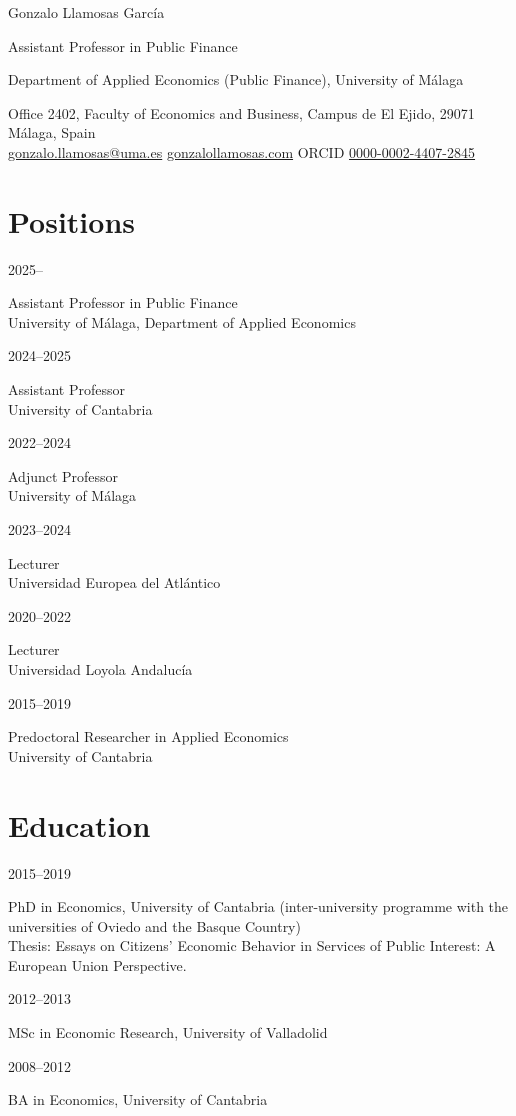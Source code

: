 \documentclass[11pt,a4paper]{article}
\newcommand{\entry}[2]{\begin{minipage}[t]{2.6cm}\sffamily\small\textcolor{muted}{#1}\end{minipage}%
  \begin{minipage}[t]{\linewidth-2.6cm}\raggedright #2\end{minipage}\par\vspace{4pt}}
\begin{document}
{\slab\color{accent}\fontsize{26}{30}\selectfont Gonzalo Llamosas García}\par\vspace{6pt}
{\sffamily\large Assistant Professor in Public Finance}\par\vspace{2pt}
{\sffamily Department of Applied Economics (Public Finance), University of Málaga}\par\vspace{6pt}
{\sffamily\small\color{muted}Office 2402, Faculty of Economics and Business, Campus de El Ejido, 29071 Málaga, Spain\\
\href{mailto:gonzalo.llamosas@uma.es}{gonzalo.llamosas@uma.es} \quad \href{https://gonzalollamosas.com}{gonzalollamosas.com} \quad ORCID \href{https://orcid.org/0000-0002-4407-2845}{0000-0002-4407-2845}}\par
\vspace{4pt}{\sffamily\small Accredited by ANECA as Associate Professor}\par
\section{Positions}
\entry{2025–}{Assistant Professor in Public Finance\\{\small\color{muted}University of Málaga, Department of Applied Economics}}
\entry{2024–2025}{Assistant Professor\\{\small\color{muted}University of Cantabria}}
\entry{2022–2024}{Adjunct Professor\\{\small\color{muted}University of Málaga}}
\entry{2023–2024}{Lecturer\\{\small\color{muted}Universidad Europea del Atlántico}}
\entry{2020–2022}{Lecturer\\{\small\color{muted}Universidad Loyola Andalucía}}
\entry{2015–2019}{Predoctoral Researcher in Applied Economics\\{\small\color{muted}University of Cantabria}}

\section{Education}
\entry{2015–2019}{PhD in Economics, University of Cantabria (inter-university programme with the universities of Oviedo and the Basque Country)\\{\small\color{muted}Thesis: Essays on Citizens’ Economic Behavior in Services of Public Interest: A European Union Perspective.}}
\entry{2012–2013}{MSc in Economic Research, University of Valladolid}
\entry{2008–2012}{BA in Economics, University of Cantabria}
\end{document}
